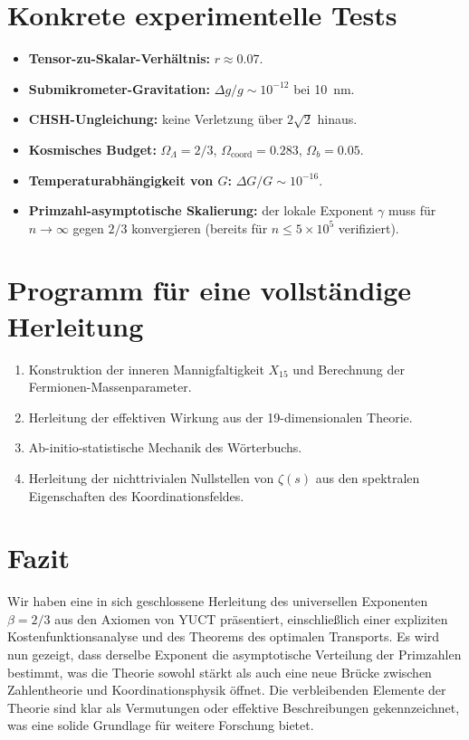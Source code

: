 \documentclass[11pt,a4paper]{article}
\newcommand{\coord}{\mathrm{coord}}
\begin{document}
	\section{Konkrete experimentelle Tests}
	\begin{itemize}
		\item \textbf{Tensor-zu-Skalar-Verhältnis:} \(r \approx 0.07\).
		\item \textbf{Submikrometer-Gravitation:} \(\Delta g/g \sim 10^{-12}\) bei 10~nm.
		\item \textbf{CHSH-Ungleichung:} keine Verletzung über \(2\sqrt{2}\) hinaus.
		\item \textbf{Kosmisches Budget:} \(\Omega_\Lambda = 2/3\), \(\Omega_{\coord} = 0.283\), \(\Omega_b = 0.05\).
		\item \textbf{Temperaturabhängigkeit von \(G\):} \(\Delta G/G \sim 10^{-16}\).
		\item \textbf{Primzahl-asymptotische Skalierung:} der lokale Exponent \(\gamma\) muss für \(n\to\infty\) gegen \(2/3\) konvergieren (bereits für \(n\le 5\times10^5\) verifiziert).
	\end{itemize}
	
	\section{Programm für eine vollständige Herleitung}
	\begin{enumerate}
		\item Konstruktion der inneren Mannigfaltigkeit \(X_{15}\) und Berechnung der Fermionen-Massenparameter.
		\item Herleitung der effektiven Wirkung aus der 19-dimensionalen Theorie.
		\item Ab-initio-statistische Mechanik des Wörterbuchs.
		\item Herleitung der nichttrivialen Nullstellen von \(\zeta(s)\) aus den spektralen Eigenschaften des Koordinationsfeldes.
	\end{enumerate}
	
	\section{Fazit}
	Wir haben eine in sich geschlossene Herleitung des universellen Exponenten \(\beta = 2/3\) aus den Axiomen von YUCT präsentiert, einschließlich einer expliziten Kostenfunktionsanalyse und des Theorems des optimalen Transports. Es wird nun gezeigt, dass derselbe Exponent die asymptotische Verteilung der Primzahlen bestimmt, was die Theorie sowohl stärkt als auch eine neue Brücke zwischen Zahlentheorie und Koordinationsphysik öffnet. Die verbleibenden Elemente der Theorie sind klar als Vermutungen oder effektive Beschreibungen gekennzeichnet, was eine solide Grundlage für weitere Forschung bietet.
	
\end{document}
